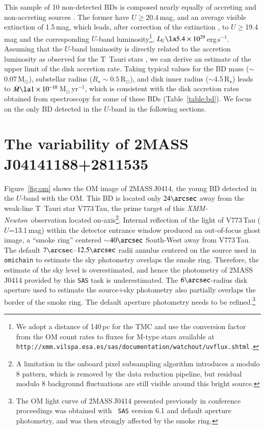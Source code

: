 \documentclass{aa}
\newcommand{\xmm}{{\it XMM-Newton}}
\begin{document}
This sample of 10 non-detected BDs is composed nearly equally of accreting
and non-accreting sources \citep[see][]{grosso06}. The former
have $U$$\ge$20.4\,mag, and an average visible extinction of 1.5\,mag,
which leads, after correction of the extinction \citep[][ with $R_{\rm
V}$=3.1]{cardelli89}, to $U$$\ge$19.4\,mag and the corresponding
$U$-band luminosity\footnote{ We adopt a distance of 140\,pc for the
TMC and use the conversion factor from the OM
count rates to fluxes for M-type stars available at {\tt
http://xmm.vilspa.esa.es/sas/documentation/watchout/\-uvflux.shtml}\,.},
$L_{\rm U} \la 5.4\times 10^{29}$\,erg\,s$^{-1}$. Assuming that the
$U$-band luminosity is directly related to the accretion luminosity as
observed for the T~Tauri stars \citep{gullbring98}, we can derive an
estimate of the upper limit of the disk accretion rate. Taking typical
values for the BD mass ($\sim$0.07\,M$_\odot$), substellar radius ($R_\star \sim
0.5$\,R$_\odot$), and disk inner radius ($\sim$4.5\,R$_\star$) leads
to $\dot{M} \la 1 \times 10^{-10}$\,M$_\odot$\,yr$^{-1}$, which is consistent
with the disk accretion rates obtained from spectroscopy for some of these
BDs (Table~\ref{table:bd}). We focus on the only BD detected in the
$U$-band in the following sections.

\section{The variability of 2MASS\,J04141188+2811535}
\label{variability}

Figure~\ref{fig:om} shows the OM image of 2MASS\,J0414, the young BD
detected in the $U$-band with the OM.
This BD is located only $24\arcsec$ away from the weak-line T~Tauri
star V773\,Tau, the prime target of this \xmm~observation located
on-axis\footnote{A limitation in the onboard pixel subsampling
algorithm introduces a modulo 8 pattern, which is removed by the data
reduction pipeline, but residual modulo 8 background fluctuations are
still visible around this bright source.}.
Internal reflection of the light of V773\,Tau ($U$=13.1\,mag) within the
detector entrance window produced an out-of-focus ghost image, a ``smoke ring''
centered $\sim$$40\arcsec$ South-West away from V773\,Tau. 
The default $7\arcsec$--$12.5\arcsec$ radii annulus centered on the
source used in {\tt omichain} to estimate the sky photometry overlaps
the smoke ring. Therefore, the estimate of the sky level is
overestimated, and hence the photometry of 2MASS\,J0414 provided by this
{\tt SAS} task is underestimated. The $6\arcsec$-radius disk aperture used
to estimate the source+sky photometry also partially overlaps the
border of the smoke ring. The default aperture photometry needs to be
refined.\footnote{The OM light curve of 2MASS\,J0414 presented previously
in conference proceedings \citep{grosso06c} was obtained with {\tt
SAS} version 6.1 and default aperture photometry, and was then
strongly affected by the smoke ring.}
\end{document}
